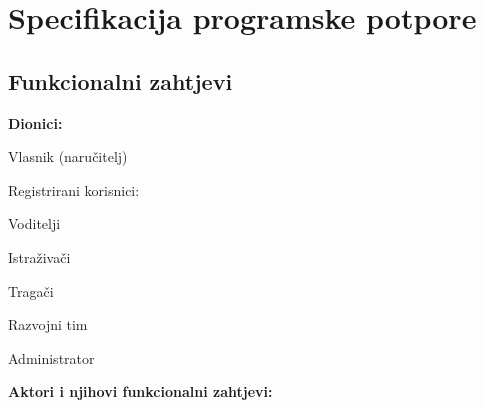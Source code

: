 \chapter{Specifikacija programske potpore}
		
	\section{Funkcionalni zahtjevi}
			
			
			\noindent \textbf{Dionici:}
			
			\begin{packed_enum}
				
				\item Vlasnik (naručitelj)
				\item Registrirani korisnici:
							
					\begin{packed_enum}
						\item Voditelji
						\item Istraživači
						\item Tragači
					\end{packed_enum}
					
				\item Razvojni tim
				\item Administrator
				
				
			\end{packed_enum}
			
			\noindent \textbf{Aktori i njihovi funkcionalni zahtjevi:}
			
